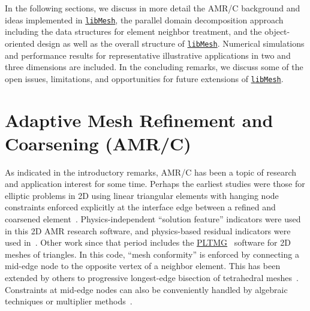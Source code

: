 \documentclass[global,twocolumn,final]{svjour}
\newcommand{\libMesh}{\href{http://libmesh.sourceforge.net}{\texttt{lib\-Mesh}}}
\newcommand{\PLTMG}{\href{http://www.netlib.org/pltmg}{PL\-T\-MG}}
\begin{document}
In the following sections, we discuss in more detail the AMR/C
background and ideas implemented in \libMesh, the parallel domain
decomposition approach including the data structures for element
neighbor treatment, and the object-oriented design as well as the
overall structure of \libMesh.  Numerical simulations and performance
results for representative illustrative applications in two and three
dimensions are included.  In the concluding remarks, we discuss some
of the open issues, limitations, and opportunities for future
extensions of \libMesh.

\section{Adaptive Mesh Refinement and Coarsening (AMR/C)\label{sec:amrc}}
As indicated in the introductory remarks, AMR/C has been a topic of
research and application interest for some time.  Perhaps the earliest
studies were those for elliptic problems in 2D using linear triangular
elements with hanging node constraints enforced explicitly at the
interface edge between a refined and coarsened
element~\cite{carey_1976a,carey_1976b}.  Physics-independent
``solution feature'' indicators were used in this 2D AMR research
software, and physics-based residual indicators were used in~\cite{carey_1975}.
Other work since
that period includes the \PLTMG{}~\cite{bank_pltmg} software for 2D meshes of triangles.
In this code, ``mesh conformity'' is enforced by connecting a
mid-edge node to the opposite vertex of a neighbor element.
This has been extended by others to progressive longest-edge
bisection of tetrahedral
me\-shes~\cite{plaza_carey_2000,plaza_padron_carey_2000}.  Constraints
at mid-edge nodes can also be conveniently handled by algebraic
techniques or multiplier methods~\cite{carey_1982,carey_gridbook}.
\end{document}

